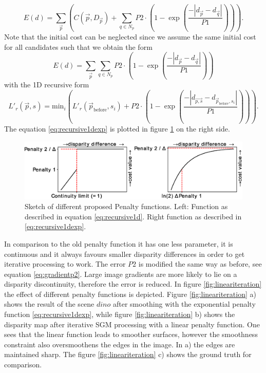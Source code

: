 \documentclass  [
  paper    = a4,
  BCOR     = 10mm,
  twoside,
  fontsize = 12pt,
  fleqn,
  toc      = bibnumbered,
  toc      = listofnumbered,
  numbers  = noendperiod,
  headings = normal,
  listof   = leveldown,
  version  = 3.03
]                                       {scrreprt}
\begin{document}
\begin{equation}\label{eq:global_sgm_function}
E(d) = \sum_{\vec p} \left(C(\vec{p}, D_{\vec p}) + \sum_{q\in N_p} 
P2\cdot \left(1- \exp\left(\frac{-|d_{\vec{p}} - d_{\vec{q}}|}{P1}\right)\right)
\right).
\end{equation}
Note that the initial cost can be neglected since we assume the same initial cost for all candidates such that we obtain the form
\begin{equation}\label{eq:global_sgm_function_wo}
E(d) = \sum_{\vec p}\sum_{q\in N_p} 
P2\cdot \left(1- \exp\left(\frac{-|d_{\vec{p}} - d_{\vec{q}}|}{P1}\right)\right)
\end{equation}
with the 1D recursive form
\begin{equation}\label{eq:recursive1dexp}
L'_r(\vec{p}, s) = \text{min}_i\left( L'_r(\vec{p}_\text{before}, s_i) + P2\cdot \left(1- \exp\left(\frac{-|d_{\vec{p,s}} - d_{\vec{p}_\text{before}, s_i}|}{P1}\right)\right)\right).
\end{equation}
The equation \ref{eq:recursive1dexp} is plotted in figure \ref{fig:penaltyfunction} on the right side. 
\begin{figure}[h!]
	\centering
	\includegraphics[width=1\linewidth]{images/penalty_function}
	\caption[Iterative SGM: Penalty function]{Sketch of different proposed Penalty functions. Left: Function as described in equation \ref{eq:recursive1d}. Right function as described in \ref{eq:recursive1dexp}.}
	\label{fig:penaltyfunction}
\end{figure}
In comparison to the old penalty function it has one less parameter, it is continuous and it always favours smaller disparity differences in order to get iterative processing to work. The error $P2$ is modified the same way as before, see equation \ref{eq:gradientp2}. Large image gradients are more likely to lie on a disparity discontinuity, therefore the error is reduced.
In figure \ref{fig:lineariteration} the effect of different penalty functions is depicted. Figure \ref{fig:lineariteration} a) shows the result of the scene $dino$ after smoothing with the exponential penalty function \ref{eq:recursive1dexp}, while figure \ref{fig:lineariteration} b) shows the disparity map after iterative SGM processing with a linear penalty function. One sees that the linear function leads to smoother surfaces, however the smoothness constraint also oversmoothens the edges in the image. In a) the edges are maintained sharp. The figure \ref{fig:lineariteration} c) shows the ground truth for comparison. 
\end{document}
